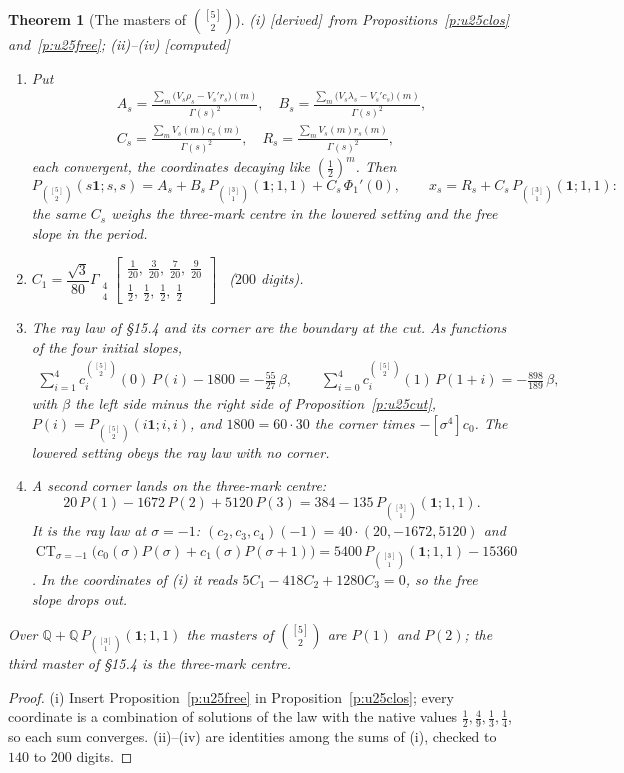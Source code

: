 \documentclass[11pt]{article}
\newcommand{\one}{\mathbf 1}
\newcommand{\Gst}[4]{\Gamma_{\substack{#1\\#2}}\!\begin{bmatrix}#3\\#4\end{bmatrix}}
\DeclareMathOperator*{\CT}{CT}
\newcommand{\Pth}{P_{\binom{[3]}1}(\one;1,1)}
\theoremstyle{plain}
\newtheorem{theorem}[proposition]{Theorem}
\theoremstyle{definition}
\theoremstyle{remark}
\newcommand{\derived}{\textup{[derived]}}
\newcommand{\computed}{\textup{[computed]}}
\begin{document}
\begin{theorem}[The masters of $\binom{[5]}2$]\label{t:u25masters}(i) \derived\ from Propositions~\ref{p:u25clos} and~\ref{p:u25free}; (ii)--(iv) \computed\
\begin{enumerate}[label=(\roman*)]
\item Put
\begin{gather*}
A_s=\frac{\sum_m\big(V_s\rho_s-V_s'r_s\big)(m)}{\Gamma(s)^2},\quad B_s=\frac{\sum_m\big(V_s\lambda_s-V_s'c_s\big)(m)}{\Gamma(s)^2},\\
C_s=\frac{\sum_mV_s(m)c_s(m)}{\Gamma(s)^2},\quad R_s=\frac{\sum_mV_s(m)r_s(m)}{\Gamma(s)^2},
\end{gather*}
each convergent, the coordinates decaying like $(\frac12)^m$. Then
\[
P_{\binom{[5]}2}(s\one;s,s)=A_s+B_s\,\Pth+C_s\,\Phi_1'(0),\qquad x_s=R_s+C_s\,\Pth :
\]
the same $C_s$ weighs the three-mark centre in the lowered setting and the free slope in the period.
\item $C_1=\dfrac{\sqrt3}{80}\Gst44{\tfrac1{20},\ \tfrac3{20},\ \tfrac7{20},\ \tfrac9{20}}{\tfrac12,\ \tfrac12,\ \tfrac12,\ \tfrac12}$ \ ($200$ digits).
\item The ray law of \S15.4 and its corner are the boundary at the cut. As functions of the four initial slopes,
\begin{gather*}
\sum_{i=1}^4c^{\binom{[5]}2}_i(0)\,P(i)-1800=-\tfrac{55}{27}\,\beta,\qquad\sum_{i=0}^4c^{\binom{[5]}2}_i(1)\,P(1+i)=-\tfrac{898}{189}\,\beta,
\end{gather*}
with $\beta$ the left side minus the right side of Proposition~\ref{p:u25cut}, $P(i)=P_{\binom{[5]}2}(i\one;i,i)$, and $1800=60\cdot30$ the corner times $-[\sigma^4]c_0$. The lowered setting obeys the ray law with no corner.
\item A second corner lands on the three-mark centre:
\[
20\,P(1)-1672\,P(2)+5120\,P(3)=384-135\,\Pth .
\]
It is the ray law at $\sigma=-1$: $(c_2,c_3,c_4)(-1)=40\cdot(20,-1672,5120)$ and $\CT_{\sigma=-1}\big(c_0(\sigma)P(\sigma)+c_1(\sigma)P(\sigma+1)\big)=5400\,\Pth-15360$. In the coordinates of (i) it reads $5C_1-418C_2+1280C_3=0$, so the free slope drops out.
\end{enumerate}
Over $\mathbb Q+\mathbb Q\,\Pth$ the masters of $\binom{[5]}2$ are $P(1)$ and $P(2)$; the third master of \S15.4 is the three-mark centre.
\end{theorem}

\begin{proof}
(i) Insert Proposition~\ref{p:u25free} in Proposition~\ref{p:u25clos}; every coordinate is a combination of solutions of the law with the native values $\frac12,\frac49,\frac13,\frac14$, so each sum converges. (ii)--(iv) are identities among the sums of (i), checked to $140$ to $200$ digits.
\end{proof}
\end{document}
